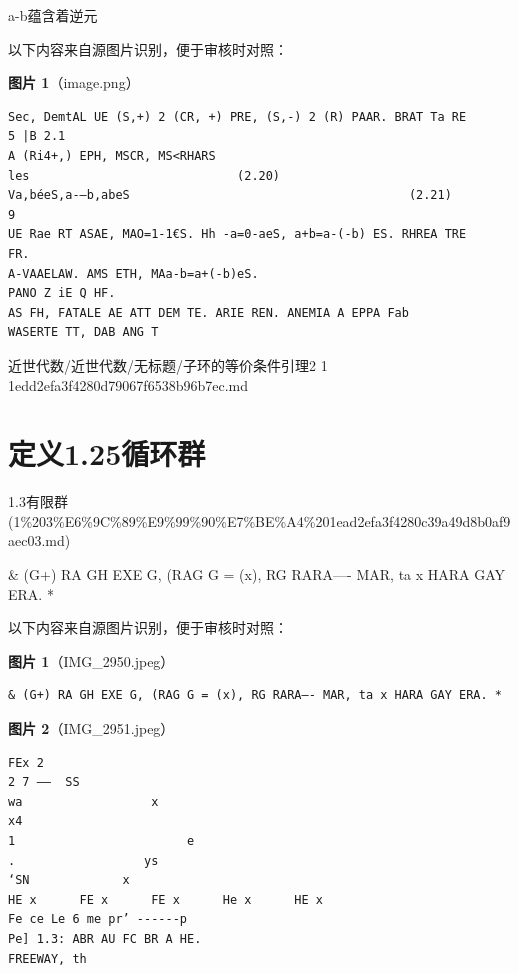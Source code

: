 \begin{lemma}[子环的等价条件引理2.1]

a-b蕴含着逆元

\end{lemma}

\begin{note}
以下内容来自源图片识别，便于审核时对照：

\textbf{图片 1}（image.png）
\begin{Verbatim}[fontsize=\small]
Sec, DemtAL UE (S,+) 2 (CR, +) PRE, (S,-) 2 (R) PAAR. BRAT Ta RE
5 |B 2.1
A (Ri4+,) EPH, MSCR, MS<RHARS
les                             (2.20)
Va,béeS,a-—b,abeS                                       (2.21)
9
UE Rae RT ASAE, MAO=1-1€S. Hh -a=0-aeS, a+b=a-(-b) ES. RHREA TRE
FR.
A-VAAELAW. AMS ETH, MAa-b=a+(-b)eS.
PANO Z iE Q HF.
AS FH, FATALE AE ATT DEM TE. ARIE REN. ANEMIA A EPPA Fab
WASERTE TT, DAB ANG T
\end{Verbatim}

\end{note}

\begin{note}[来源路径]

近世代数/近世代数/无标题/子环的等价条件引理2 1 1edd2efa3f4280d79067f6538b96b7ec.md

\end{note}

\section*{定义1.25循环群}

\begin{note}[来源上级主题]

1.3有限群 (1\%203\%E6\%9C\%89\%E9\%99\%90\%E7\%BE\%A4\%201ead2efa3f4280c39a49d8b0af9aec03.md)

\end{note}

\begin{definition}[定义1.25循环群]

\& (G+) RA GH EXE G, (RAG G = (x), RG RARA—- MAR, ta x HARA GAY ERA. *

\end{definition}

\begin{note}
以下内容来自源图片识别，便于审核时对照：

\textbf{图片 1}（IMG\_2950.jpeg）
\begin{Verbatim}[fontsize=\small]
& (G+) RA GH EXE G, (RAG G = (x), RG RARA—- MAR, ta x HARA GAY ERA. *
\end{Verbatim}

\textbf{图片 2}（IMG\_2951.jpeg）
\begin{Verbatim}[fontsize=\small]
FEx 2
2 7 ——  SS
wa                  x
x4
1                        e
.                  ys
‘SN             x
HE x      FE x      FE x      He x      HE x
Fe ce Le 6 me pr’ ------p
Pe] 1.3: ABR AU FC BR A HE.
FREEWAY, th
\end{Verbatim}

\end{note}

